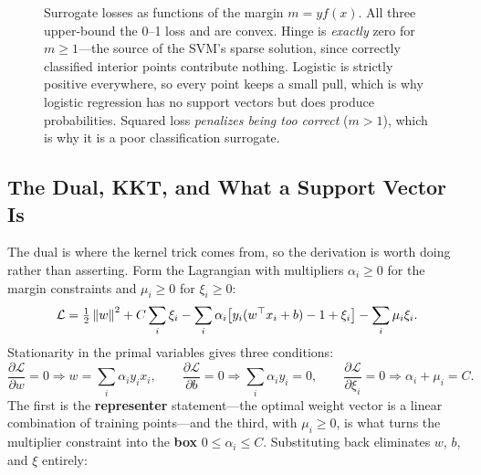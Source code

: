 \begin{figure}[H]
\centering
{}
\caption{Surrogate losses as functions of the margin $m = y f(x)$. All three upper-bound the 0--1 loss and are convex. Hinge is \emph{exactly} zero for $m \ge 1$---the source of the SVM's sparse solution, since correctly classified interior points contribute nothing. Logistic is strictly positive everywhere, so every point keeps a small pull, which is why logistic regression has no support vectors but does produce probabilities. Squared loss \emph{penalizes being too correct} ($m > 1$), which is why it is a poor classification surrogate.}
\label{cml:fig:margin_losses}
\end{figure}

\subsection{The Dual, KKT, and What a Support Vector Is}

The dual is where the kernel trick comes from, so the derivation is worth doing rather than asserting. Form the Lagrangian with multipliers $\alpha_i \ge 0$ for the margin constraints and $\mu_i \ge 0$ for $\xi_i \ge 0$:
\begin{equation}
\mathcal{L} = \tfrac12\left\lVert w\right\rVert^2 + C\sum_i \xi_i - \sum_i \alpha_i\big[y_i(w^{\top}x_i+b) - 1 + \xi_i\big] - \sum_i \mu_i \xi_i .
\end{equation}
Stationarity in the primal variables gives three conditions:
\begin{equation}
\frac{\partial \mathcal{L}}{\partial w} = 0 \Rightarrow w = \sum_i \alpha_i y_i x_i,
\qquad
\frac{\partial \mathcal{L}}{\partial b} = 0 \Rightarrow \sum_i \alpha_i y_i = 0,
\qquad
\frac{\partial \mathcal{L}}{\partial \xi_i} = 0 \Rightarrow \alpha_i + \mu_i = C .
\end{equation}
The first is the \textbf{representer} statement---the optimal weight vector is a linear combination of training points---and the third, with $\mu_i \ge 0$, is what turns the multiplier constraint into the \textbf{box} $0 \le \alpha_i \le C$. Substituting back eliminates $w$, $b$, and $\xi$ entirely:


